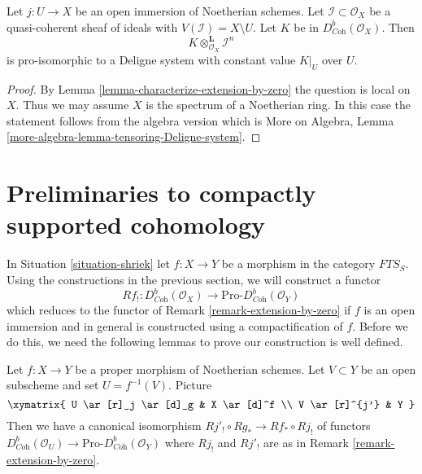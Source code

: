\begin{lemma}
\label{lemma-tensoring-Deligne-system}
Let $j : U \to X$ be an open immersion of Noetherian schemes. Let
$\mathcal{I} \subset \mathcal{O}_X$ be a quasi-coherent sheaf of
ideals with $V(\mathcal{I}) = X \setminus U$.
Let $K$ be in $D^b_{\textit{Coh}}(\mathcal{O}_X)$.
Then
$$
K \otimes_{\mathcal{O}_X}^\mathbf{L} \mathcal{I}^n
$$
is pro-isomorphic to a Deligne system with constant value $K|_U$ over $U$.
\end{lemma}

\begin{proof}
By Lemma \ref{lemma-characterize-extension-by-zero} the question is
local on $X$. Thus we may assume $X$ is the spectrum of a Noetherian
ring. In this case the statement follows from the algebra version which is
More on Algebra, Lemma \ref{more-algebra-lemma-tensoring-Deligne-system}.
\end{proof}







\section{Preliminaries to compactly supported cohomology}
\label{section-preliminaries-compactly-supported}

\noindent
In Situation \ref{situation-shriek} let $f : X \to Y$ be a morphism
in the category $\textit{FTS}_S$. Using the constructions in the
previous section, we will construct a functor
$$
Rf_! :
D^b_{\textit{Coh}}(\mathcal{O}_X)
\longrightarrow
\text{Pro-}D^b_{\textit{Coh}}(\mathcal{O}_Y)
$$
which reduces to the functor of Remark \ref{remark-extension-by-zero}
if $f$ is an open immersion and in general is constructed using a
compactification of $f$. Before we do this, we need the following lemmas
to prove our construction is well defined.

\begin{lemma}
\label{lemma-well-defined-pre}
Let $f : X \to Y$ be a proper morphism of Noetherian schemes.
Let $V \subset Y$ be an open subscheme and set $U = f^{-1}(V)$.
Picture
$$
\xymatrix{
U \ar[r]_j \ar[d]_g & X \ar[d]^f \\
V \ar[r]^{j'} & Y
}
$$
Then we have a canonical isomorphism $Rj'_! \circ Rg_* \to Rf_* \circ Rj_!$
of functors $D^b_{\textit{Coh}}(\mathcal{O}_U) \to
\text{Pro-}D^b_{\textit{Coh}}(\mathcal{O}_Y)$ where
$Rj_!$ and $Rj'_!$ are as in Remark \ref{remark-extension-by-zero}.
\end{lemma}

